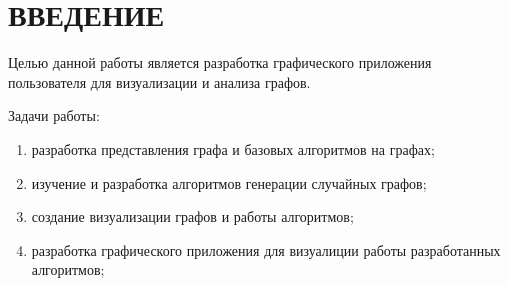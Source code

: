 \section*{ВВЕДЕНИЕ}
Целью данной работы является разработка графического
приложения пользователя для визуализации 
и анализа графов.

Задачи  работы:
\begin{enumerate}
    \item разработка представления графа и базовых алгоритмов на
        графах;
    \item изучение и разработка алгоритмов генерации случайных
        графов;
    \item создание визуализации графов и работы алгоритмов;
    \item разработка графического приложения 
        для визуалиции работы разработанных алгоритмов;
\end{enumerate}
